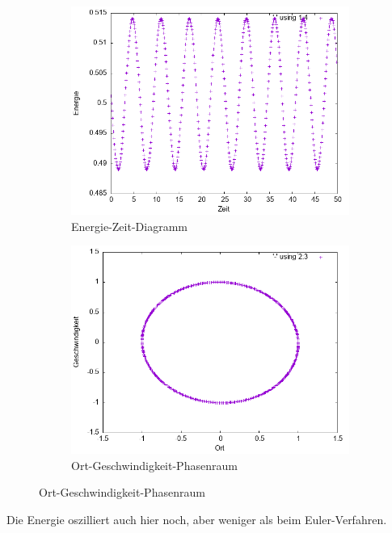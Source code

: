 \documentclass[
    oneside,
    ngerman,
    footinclude=false,
    captions=tableheading,
    DIV=12
]{scrartcl}
\begin{document}
            \begin{figure}[H]
            \centering
            \begin{subfigure}[b]{0.45\textwidth}
                \centering
                \includegraphics[width=\textwidth]{Bilddateien/RK2A1(a)-01-E.png}
                \caption{Energie-Zeit-Diagramm}
                \label{fig:RK2A1(a)-01-0-E}
            \end{subfigure}
            \hfill
            \begin{subfigure}[b]{0.45\textwidth}
                \centering
                \includegraphics[width=\textwidth]{Bilddateien/RK2A1(a)-01-0-xv.png}
                \caption{Ort-Geschwindigkeit-Phasenraum}
                \label{fig:RK2A1(a)-01-0-xv}
            \end{subfigure}
            \end{figure}
            Die Energie oszilliert auch hier noch, aber weniger als beim Euler-Verfahren.
            \newpage
\end{document}

